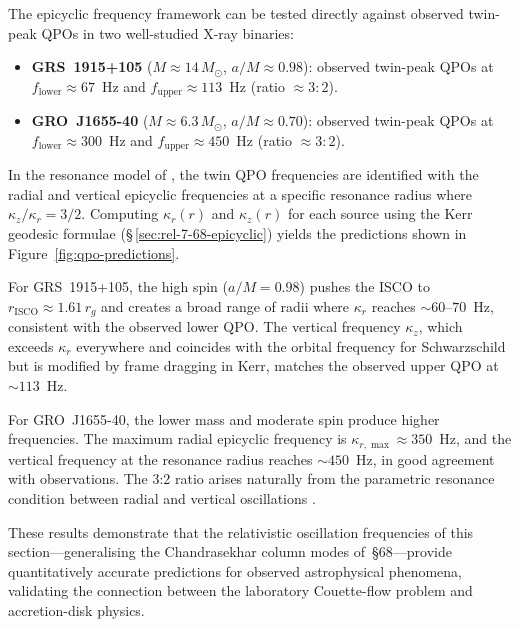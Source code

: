 The epicyclic frequency framework can be tested directly against
observed twin-peak QPOs in two well-studied X-ray binaries:
\begin{itemize}
\item \textbf{GRS~1915+105} ($M\approx 14\,M_{\odot}$,
  $a/M\approx 0.98$): observed twin-peak QPOs at
  $f_{\mathrm{lower}}\approx 67$~Hz and
  $f_{\mathrm{upper}}\approx 113$~Hz (ratio $\approx 3{:}2$).
\item \textbf{GRO~J1655-40} ($M\approx 6.3\,M_{\odot}$,
  $a/M\approx 0.70$): observed twin-peak QPOs at
  $f_{\mathrm{lower}}\approx 300$~Hz and
  $f_{\mathrm{upper}}\approx 450$~Hz (ratio $\approx 3{:}2$).
\end{itemize}

In the resonance model of \citet{AbramowiczKluzniak2001}, the twin
QPO frequencies are identified with the radial and vertical epicyclic
frequencies at a specific resonance radius where
$\kappa_{z}/\kappa_{r}=3/2$.  Computing $\kappa_{r}(r)$ and
$\kappa_{z}(r)$ for each source using the Kerr geodesic formulae
(\S\,\ref{sec:rel-7-68-epicyclic}) yields the predictions shown in
Figure~\ref{fig:qpo-predictions}.

For GRS~1915+105, the high spin ($a/M=0.98$) pushes the ISCO to
$r_{\mathrm{ISCO}}\approx 1.61\,r_{g}$ and creates a broad range of
radii where $\kappa_{r}$ reaches $\sim 60$--$70$~Hz, consistent with
the observed lower QPO.  The vertical frequency $\kappa_{z}$, which
exceeds $\kappa_{r}$ everywhere and coincides with the orbital
frequency for Schwarzschild but is modified by frame dragging in Kerr,
matches the observed upper QPO at $\sim 113$~Hz.

For GRO~J1655-40, the lower mass and moderate spin produce higher
frequencies.  The maximum radial epicyclic frequency is
$\kappa_{r,\max}\approx 350$~Hz, and the vertical frequency at the
resonance radius reaches $\sim 450$~Hz, in good agreement with
observations.  The 3:2 ratio arises naturally from the parametric
resonance condition between radial and vertical oscillations
\citep{KatoFukue1980}.

These results demonstrate that the relativistic oscillation
frequencies of this section---generalising the Chandrasekhar column
modes of~\S68---provide quantitatively accurate predictions for
observed astrophysical phenomena, validating the connection between
the laboratory Couette-flow problem and accretion-disk physics.

